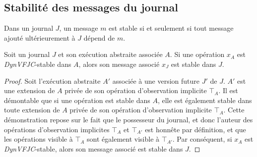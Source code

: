 %




\subsection{Stabilité des messages du journal}\label{subsec:msg-stable}

\begin{definition}
Dans un journal $J$, un message $m$ est stable si et seulement si tout message ajouté ultérieurement à $J$ dépend de $m$.
\end{definition}

\begin{theorem}\label{th:op-msg-stable}
Soit un journal $J$ et son exécution abstraite associée $A$.
Si une opération $x_A$ est \emph{DynVFJC}-stable dans $A$, alors son message associé $x_J$ est stable dans $J$.
\end{theorem}

\begin{proof}
Soit l'exécution abstraite $A'$ associée à une version future $J'$ de $J$.
$A'$ est une extension de $A$ privée de son opération d'observation implicite $\top_A$.
Il est démontable que si une opération est stable dans $A$, elle est également stable dans toute extension de $A$ privée de son opération d'observation implicite $\top_A$.
Cette démonstration repose sur le fait que le possesseur du journal, et donc l'auteur des opérations d'observation implicites $\top_A$ et $\top_{A'}$ est honnête par définition, et que les opérations visible à $\top_A$ sont également visible à $\top_{A'}$.
Par conséquent, si $x_A$ est \emph{DynVFJC}-stable, alors son message associé est stable dans $J$.
\end{proof}


